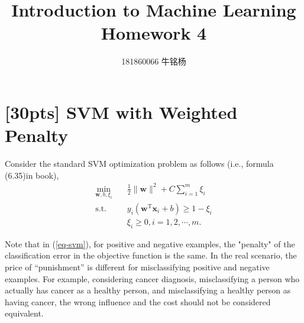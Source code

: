 \documentclass{article}
\title{Introduction to Machine Learning\\Homework 4}
\author{181860066 牛铭杨}
\begin{document}
	\maketitle
	
    \section{[30pts] SVM with Weighted Penalty}
    Consider the standard SVM optimization problem as follows (i.e., formula (6.35)in book),
    \begin{equation}
    	\label{eq-svm}
    	\begin{split}
    		\min_{\mathbf{w},b,\xi_i}& \quad \frac{1}{2} \lVert \mathbf{w} \rVert^2 + C\sum_{i=1}^m\xi_i\\
    		\text{s.t.}&  \quad y_i(\mathbf{w}^\mathrm{T}\mathbf{x}_i + b)\geq 1-\xi_i\\
    		& \quad \xi_i \geq 0, i = 1,2,\cdots,m.
    	\end{split}
    \end{equation}

    Note that in (\ref{eq-svm}), for positive and negative examples, the "penalty" of the classification error in the objective function is the same. In the real scenario, the price of “punishment” is different for misclassifying positive and negative examples. For example, considering cancer diagnosis, misclassifying a person who actually has cancer as a healthy person, and misclassifying a healthy person as having cancer, the wrong influence and the cost should not be considered equivalent.
\end{document}
